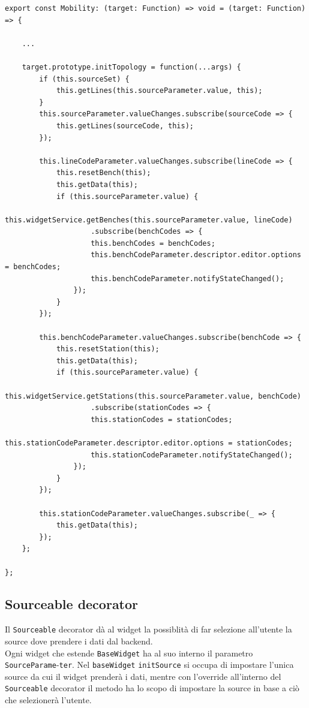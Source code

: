 \begin{lstlisting}[caption={Metodo initTopology all'interno del decorator Mobility}, style=javaScriptCode]
export const Mobility: (target: Function) => void = (target: Function) => {

    ...

    target.prototype.initTopology = function(...args) {
        if (this.sourceSet) {
            this.getLines(this.sourceParameter.value, this);
        }
        this.sourceParameter.valueChanges.subscribe(sourceCode => {
            this.getLines(sourceCode, this);
        });

        this.lineCodeParameter.valueChanges.subscribe(lineCode => {
            this.resetBench(this);
            this.getData(this);
            if (this.sourceParameter.value) {
                this.widgetService.getBenches(this.sourceParameter.value, lineCode)
                    .subscribe(benchCodes => {
                    this.benchCodes = benchCodes;
                    this.benchCodeParameter.descriptor.editor.options = benchCodes;
                    this.benchCodeParameter.notifyStateChanged();
                });
            }
        });

        this.benchCodeParameter.valueChanges.subscribe(benchCode => {
            this.resetStation(this);
            this.getData(this);
            if (this.sourceParameter.value) {
                this.widgetService.getStations(this.sourceParameter.value, benchCode)
                    .subscribe(stationCodes => {
                    this.stationCodes = stationCodes;
                    this.stationCodeParameter.descriptor.editor.options = stationCodes;
                    this.stationCodeParameter.notifyStateChanged();
                });
            }
        });

        this.stationCodeParameter.valueChanges.subscribe(_ => {
            this.getData(this);
        });
    };

};
\end{lstlisting}

\subsection{Sourceable decorator}
Il \verb|Sourceable| decorator dà al widget la possiblità di far selezione all'utente la source dove prendere i dati dal backend. \\ Ogni widget che estende \verb|BaseWidget| ha al suo interno il parametro \verb|SourceParame|-\verb|ter|. Nel \verb|baseWidget| \verb|initSource| si occupa di impostare l'unica source da cui il widget prenderà i dati, mentre con l'override all'interno del \verb|Sourceable| decorator il metodo ha lo scopo di impostare la source in base a ciò che selezionerà l'utente.\\

